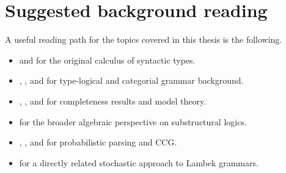 \section{Suggested background reading}
A useful reading path for the topics covered in this thesis is the following.
\begin{itemize}
    \item \citet{Lambek1958} and \citet{Lambek1961} for the original calculus of syntactic types.
    \item \citet{vanBenthem1988}, \citet{Moortgat1997}, and \citet{Morrill1994} for type-logical and
    categorial grammar background.
    \item \citet{AndrekaMikulas1994}, \citet{Dosen1985}, and \citet{Pentus1995} for completeness
    results and model theory.
    \item \citet{GalatosJipsenKowalskiOno2007} for the broader algebraic perspective on substructural logics.
    \item \citet{ManningSchutze1999}, \citet{Steedman2000}, and \citet{ClarkCurran2007} for
    probabilistic parsing and CCG.
    \item \citet{BonfanteDeGroote2004} for a directly related stochastic approach to Lambek
    grammars.
\end{itemize}

